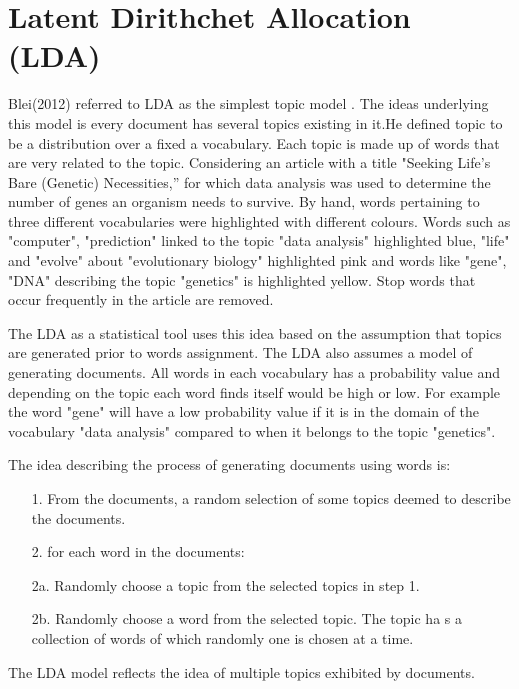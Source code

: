 \section{ Latent Dirithchet Allocation (LDA)}
\begin{flushleft}
Blei(2012) referred to LDA as the simplest topic model . The ideas underlying this model is every document has several topics existing in it.He defined topic to be a distribution over a fixed a vocabulary.
Each topic is made up of words that are very related to the topic. Considering an article with a title "Seeking Life’s Bare (Genetic) Necessities,” for which data analysis was used to determine the number of genes an organism needs to survive. By hand, words pertaining to three different vocabularies were highlighted with different colours. Words such as "computer", "prediction" linked to the topic "data analysis" highlighted blue, "life" and "evolve" about "evolutionary biology" highlighted pink and words like "gene", "DNA" describing the topic "genetics" is highlighted yellow.
Stop words that occur frequently in the article are removed. 
\end{flushleft}

The LDA as a statistical tool uses this idea based on the assumption that topics are generated prior to words assignment. The LDA also assumes a model of generating documents. All words in each vocabulary has a probability value and depending on the topic each word finds itself would be high or low. For example the word "gene" will have a low probability value if it is in the domain of the  vocabulary "data analysis" compared to when it belongs to the topic "genetics". 

The idea describing the process of generating documents using words is:
\begin{itemize}
\item[1.] From the documents, a random selection of some topics deemed to describe the documents.
\item[2.] for each word in the documents:
		\item[2a.]Randomly choose a topic from
the selected topics in step 1.
		\item[2b.]Randomly choose a word from the selected topic. The topic ha s a collection of words of which randomly one is chosen at a time. 
\end{itemize}
The LDA model reflects the idea of multiple topics exhibited by documents.

